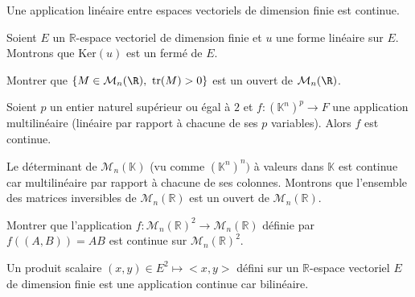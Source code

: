 \documentclass[french,11pt,twoside]{VcCours}
\begin{document}
\begin{Corollaire}{} Une application linéaire entre espaces vectoriels de dimension finie est continue.
\end{Corollaire}

\begin{Exemple} Soient $E$ un $\mathbb{R}$-espace vectoriel de dimension finie et $u$ une forme linéaire sur $E$. Montrons que $\textrm{Ker}(u)$ est un fermé de $E$.

%
%

\vspace{5cm}
\end{Exemple}

\begin{ApplicationDirecte} Montrer que $\{ M\in{\cal M}_n(\R), \ \textrm{tr}(M)>0\}$ est un ouvert de ${\cal M}_n(\R)$.
\end{ApplicationDirecte}


\begin{Theoreme}{} Soient $p$ un entier naturel supérieur ou égal à $2$ et $f : (\mathbb{K}^n)^p \rightarrow F$ une application multilinéaire (linéaire par rapport à chacune de ses $p$ variables). Alors $f$ est continue.
\end{Theoreme}

\begin{Exemple} Le déterminant de $\mathcal{M}_n(\mathbb{K})$ (vu comme $(\mathbb{K}^n)^n)$ à valeurs dans $\mathbb{K}$ est continue car multilinéaire par rapport à chacune de ses colonnes. Montrons que l'ensemble des matrices inversibles de $\mathcal{M}_n(\mathbb{R})$ est un ouvert de $\mathcal{M}_n(\mathbb{R})$.

\vspace{4cm}
%
\end{Exemple}

\begin{ApplicationDirecte} Montrer que l'application $f : \mathcal{M}_n(\mathbb{R})^2 \rightarrow \mathcal{M}_n(\mathbb{R})$ définie par $f((A,B))= AB$ est continue sur $\mathcal{M}_n(\mathbb{R})^2$.
\end{ApplicationDirecte}

\begin{Remarque}{} Un produit scalaire $(x,y) \in E^2 \longmapsto <x,y>$ défini sur un $\mathbb{R}$-espace vectoriel $E$ de dimension finie est une application continue car bilinéaire.
\end{Remarque}
\end{document}
